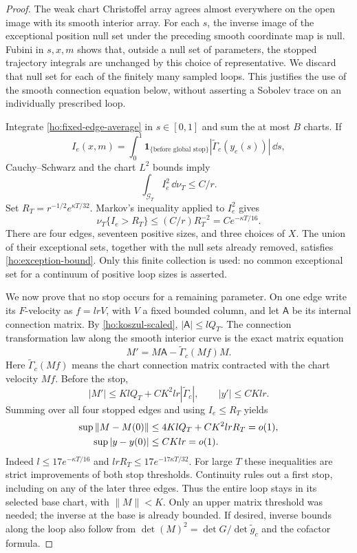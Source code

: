 \begin{proof}
The weak chart Christoffel array agrees almost everywhere on the open
image with its smooth interior array.  For each $s$, the inverse image
of the exceptional position null set under the preceding smooth
coordinate map is null.  Fubini in $s,x,m$ shows that, outside a null
set of parameters, the stopped trajectory integrals are unchanged by
this choice of representative.  We discard that null set for each of
the finitely many sampled loops.  This justifies the use of the
smooth connection equation below, without asserting a Sobolev trace
on an individually prescribed loop.

Integrate \eqref{ho:fixed-edge-average} in $s\in[0,1]$ and sum the
at most $B$ charts.  If
\[
 I_e(x,m)=\int_0^1\boldsymbol 1_{\{\text{before global stop}\}}
                 |\widetilde\Gamma_c(y_e(s))|\,\dd s,
\]
Cauchy--Schwarz and the chart $L^2$ bounds imply
\begin{equation}\label{ho:L2-average}
             \int_{\mathcal G_T} I_e^2\,\dd\nu_T\le C/r.
\end{equation}
Set $R_T=r^{-1/2}e^{\kappa T/32}$.
Markov's inequality applied to $I_e^2$ gives
\begin{equation}\label{ho:markov}
 \nu_T\{I_e>R_T\}
       \le (C/r)R_T^{-2}=C e^{-\kappa T/16}.
\end{equation}
There are four edges, seventeen positive sizes, and three choices of
$X$.  The union of their exceptional sets, together with the null
sets already removed, satisfies \eqref{ho:exception-bound}.
Only this finite collection is used: no common exceptional set for a
continuum of positive loop sizes is asserted.

We now prove that no stop occurs for a remaining parameter.
On one edge write its $F$-velocity as $f=lrV$, with $V$ a fixed bounded
column, and let $\mathsf A$ be its internal connection matrix.
By \eqref{ho:koszul-scaled}, $|\mathsf A|\le lQ_T$.
The connection transformation law along the smooth interior curve is
the exact matrix equation
\begin{equation}\label{ho:frame-ode}
            M'=M\mathsf A-\widetilde\Gamma_c(Mf)M.
\end{equation}
Here $\widetilde\Gamma_c(Mf)$ means the chart connection matrix
contracted with the chart velocity $Mf$.
Before the stop,
\[
 |M'|\le K lQ_T+C K^2lr|\widetilde\Gamma_c|,
                  \qquad |y'|\le C K lr.
\]
Summing over all four stopped edges and using $I_e\le R_T$ yields
\begin{align}\label{ho:stop-improvement}
 \sup\|M-M(0)\|&\le 4K lQ_T+C K^2lrR_T=o(1),\notag\\
 \sup|y-y(0)|&\le C K lr=o(1).
\end{align}
Indeed $l\le17e^{-\kappa T/16}$ and
$lrR_T\le17e^{-17\kappa T/32}$.
For large $T$ these inequalities are strict improvements of both stop
thresholds.  Continuity rules out a first stop, including on any of
the later three edges.  Thus the entire loop stays in its selected
base chart, with $\|M\|<K$.  Only an upper matrix threshold was needed;
the inverse at the base is already bounded.  If desired, inverse
bounds along the loop also follow from
$\det(M)^2=\det G/\det\widetilde g_c$ and the cofactor formula.


\end{proof}

